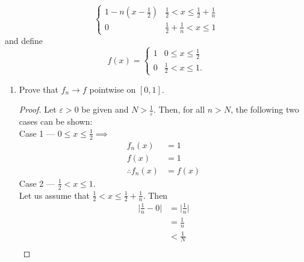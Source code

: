\documentclass{article}
\begin{document}
\begin{enumerate}
\begin{equation}
\begin{cases}
                        1-n(x-\frac{1}{2})
                         & \frac{1}{2} < x \leq \frac{1}{2}+\frac{1}{n} \\

                        0 %
                         & \frac{1}{2}+\frac{1}{n} < x \leq 1
                  \end{cases}
            \end{equation}
            and define
            \begin{equation}
                  f(x)=\begin{cases}
                        1 & 0 \leq x \leq \frac{1}{2} \\
                        0 & \frac{1}{2} < x \leq 1.
                  \end{cases}
            \end{equation}
            \begin{enumerate}
                  \item Prove that $f_n\to f$ pointwise on $[0,1]$.
                        \begin{proof}
                              Let $\varepsilon>0$ be given and $N>\frac{1}{\varepsilon}$. Then, for
                              all $n>N$, the following two cases can be
                              shown: \\
                              Case 1 — $0\leq x \leq \frac{1}{2}\implies$
                              \begin{align*}
                                    f_n(x)             & = 1    \\
                                    f(x)               & = 1    \\
                                    \therefore  f_n(x) & = f(x)
                              \end{align*}
                              Case 2 — $\frac{1}{2}< x \leq 1.$ \\
                              Let us assume that $\frac{1}{2}< x \leq\frac{1}{2} + \frac{1}{n}$.
                              Then
                              \begin{align*}
                                    \lvert\frac{1}{n}-0\rvert & = \lvert\frac{1}{n}\rvert \\
                                                              & = \frac{1}{n}             \\
                                                              & < \frac{1}{N}             \\

\end{align*}
\end{proof}
\end{enumerate}
\end{enumerate}
\end{document}
